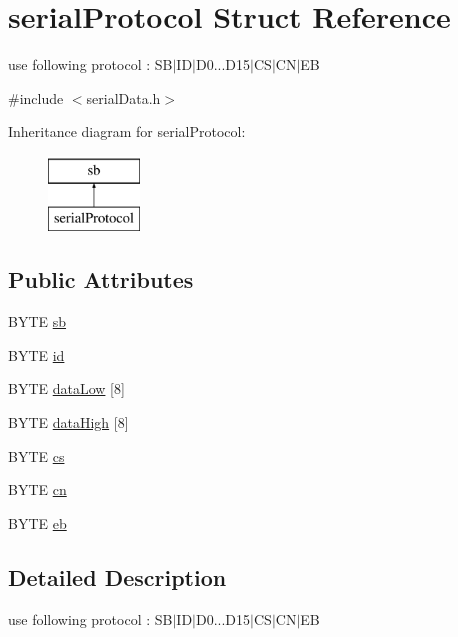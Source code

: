 \hypertarget{structserial_protocol}{}\section{serial\+Protocol Struct Reference}
\label{structserial_protocol}


use following protocol \+: S\+B$\vert$\+I\+D$\vert$\+D0...D15$\vert$\+C\+S$\vert$\+C\+N$\vert$\+E\+B  




{\ttfamily \#include $<$serial\+Data.\+h$>$}

Inheritance diagram for serial\+Protocol\+:\begin{figure}[H]
\begin{center}
\leavevmode
\includegraphics[height=2.000000cm]{structserial_protocol}
\end{center}
\end{figure}
\subsection*{Public Attributes}
\begin{DoxyCompactItemize}
\item 
B\+Y\+T\+E \hyperlink{structserial_protocol_af8bbcf22377b98dadf690666f9d48156}{sb}
\item 
B\+Y\+T\+E \hyperlink{structserial_protocol_a76964847a69881951e9da1317cc17571}{id}
\item 
B\+Y\+T\+E \hyperlink{structserial_protocol_a3e40b60e8c92091fb59e00ee05a07eb1}{data\+Low} \mbox{[}8\mbox{]}
\item 
B\+Y\+T\+E \hyperlink{structserial_protocol_a4f9b454d8730babf5397c1f1d582e727}{data\+High} \mbox{[}8\mbox{]}
\item 
B\+Y\+T\+E \hyperlink{structserial_protocol_aeafe645e9ba8983649aac07b5c85f1a2}{cs}
\item 
B\+Y\+T\+E \hyperlink{structserial_protocol_a75f22d859a2edf76df2fc96f8dd4b901}{cn}
\item 
B\+Y\+T\+E \hyperlink{structserial_protocol_af8e01f5811bdc9a2906aceed9ae19f0f}{eb}
\end{DoxyCompactItemize}


\subsection{Detailed Description}
use following protocol \+: S\+B$\vert$\+I\+D$\vert$\+D0...D15$\vert$\+C\+S$\vert$\+C\+N$\vert$\+E\+B 

